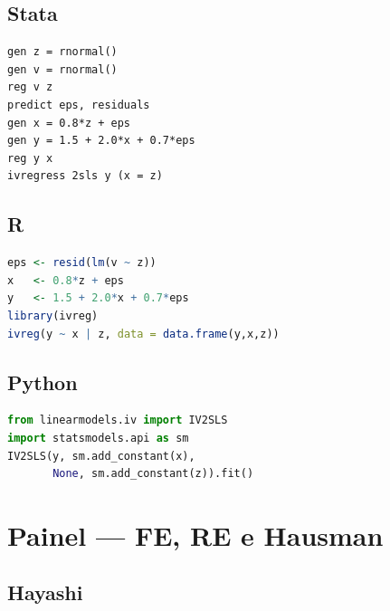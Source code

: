 \subsection*{Stata}

\begin{lstlisting}[language={}, basicstyle=\ttfamily\small,
  frame=single, numbers=none, backgroundcolor=\color{codbg}]
gen z = rnormal()
gen v = rnormal()
reg v z
predict eps, residuals
gen x = 0.8*z + eps
gen y = 1.5 + 2.0*x + 0.7*eps
reg y x
ivregress 2sls y (x = z)
\end{lstlisting}

\subsection*{R}

\begin{lstlisting}[language=R, basicstyle=\ttfamily\small,
  frame=single, numbers=none, backgroundcolor=\color{codbg},
  keywordstyle=\color{keyword}\bfseries,
  stringstyle=\color{string},
  commentstyle=\color{comment}\itshape]
eps <- resid(lm(v ~ z))
x   <- 0.8*z + eps
y   <- 1.5 + 2.0*x + 0.7*eps
library(ivreg)
ivreg(y ~ x | z, data = data.frame(y,x,z))
\end{lstlisting}

\subsection*{Python}

\begin{lstlisting}[language=Python, basicstyle=\ttfamily\small,
  frame=single, numbers=none, backgroundcolor=\color{codbg},
  keywordstyle=\color{keyword}\bfseries,
  stringstyle=\color{string},
  commentstyle=\color{comment}\itshape]
from linearmodels.iv import IV2SLS
import statsmodels.api as sm
IV2SLS(y, sm.add_constant(x),
       None, sm.add_constant(z)).fit()
\end{lstlisting}

\section{Painel — FE, RE e Hausman}

\subsection*{Hayashi}

